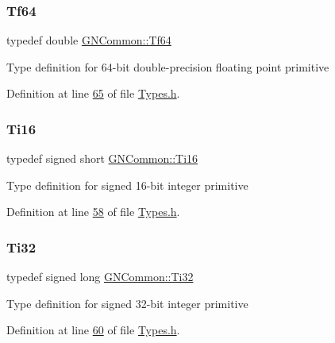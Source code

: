 \subsubsection{\texorpdfstring{Tf64}{Tf64}}
{\footnotesize\ttfamily typedef double \mbox{\hyperlink{namespace_g_n_common_a73af96f1663fd8fc5741bcbc5b1427e4}{G\+N\+Common\+::\+Tf64}}}

Type definition for 64-\/bit double-\/precision floating point primitive 

Definition at line \mbox{\hyperlink{_types_8h_source_l00065}{65}} of file \mbox{\hyperlink{_types_8h_source}{Types.\+h}}.

\mbox{\label{namespace_g_n_common_ab9a9a6aa84751cec965d8b6676318a65}} 
\subsubsection{\texorpdfstring{Ti16}{Ti16}}
{\footnotesize\ttfamily typedef signed short \mbox{\hyperlink{namespace_g_n_common_ab9a9a6aa84751cec965d8b6676318a65}{G\+N\+Common\+::\+Ti16}}}

Type definition for signed 16-\/bit integer primitive 

Definition at line \mbox{\hyperlink{_types_8h_source_l00058}{58}} of file \mbox{\hyperlink{_types_8h_source}{Types.\+h}}.

\mbox{\label{namespace_g_n_common_ad1f094ce51908947ac3d31355b560d55}} 
\subsubsection{\texorpdfstring{Ti32}{Ti32}}
{\footnotesize\ttfamily typedef signed long \mbox{\hyperlink{namespace_g_n_common_ad1f094ce51908947ac3d31355b560d55}{G\+N\+Common\+::\+Ti32}}}

Type definition for signed 32-\/bit integer primitive 

Definition at line \mbox{\hyperlink{_types_8h_source_l00060}{60}} of file \mbox{\hyperlink{_types_8h_source}{Types.\+h}}.

\mbox{\label{namespace_g_n_common_ad0a34f67eefe81cfbd0e515bba246d9d}} 
